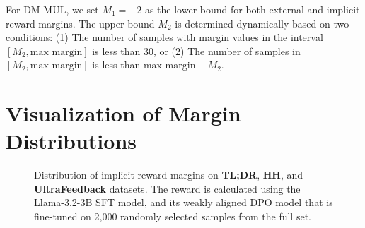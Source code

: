 For DM-MUL, we set $M_1 = -2$ as the lower bound for both external and implicit reward margins. The upper bound $M_2$ is determined dynamically based on two conditions: (1) The number of samples with margin values in the interval $[M_2, \text{max margin}]$ is less than 30, or (2) The number of samples in $[M_2, \text{max margin}]$ is less than $\text{max margin} - M_2$.

\section{Visualization of Margin Distributions}

\begin{figure*}[ht]
	\centering
        \vspace{-5pt}
        \vspace{-10pt}
	\caption{Distribution of implicit reward margins on \textbf{TL;DR}, \textbf{HH}, and \textbf{UltraFeedback} datasets. The reward is calculated using the Llama-3.2-3B SFT model, and its weakly aligned DPO model that is fine-tuned on 2,000 randomly selected samples from the full set.
	}
	\label{fig:im-margin}
	\vspace{-15pt}
\end{figure*}

